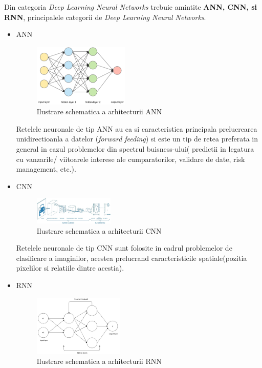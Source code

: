 \documentclass[a4paper]{article}
\begin{document}
Din categoria \textit{Deep Learning Neural
Networks} trebuie amintite \textbf{ANN, CNN, si RNN}, principalele categorii de \textit{Deep Learning Neural Networks}.
\begin{itemize}
	\label{NN}

	\item ANN

\begin{figure}[ht]
	\centering
	\includegraphics[width = 1.8in]{ann.png}
	\caption{Ilustrare schematica a arhitecturii ANN}
\label{ANN}
\end{figure}
Retelele neuronale de tip ANN au ca si caracteristica principala prelucrearea unidirectioanla a datelor (\textit{forward feeding})
si este un tip de retea preferata in general in cazul problemelor din spectrul buisness-ului( predictii in legatura cu vanzarile/
viitoarele interese ale cumparatorilor, validare de date, risk management, etc.).

	\item CNN
\begin{figure}[ht]
	\centering
	\includegraphics[width = 1.5in]{cnn.jpeg}
	\caption{Ilustrare schematica a arhitecturii CNN}
\label{CNN}
\end{figure}


Retelele neuronale de tip CNN sunt folosite in cadrul problemelor de clasificare a imaginilor, acestea prelucrand caracteristicile
spatiale(pozitia pixelilor si relatiile dintre acestia).

	\item RNN
\begin{figure}[ht]
	\centering
	\includegraphics[width = 1.7in]{rnn.jpeg}
	\caption{Ilustrare schematica a arhitecturii RNN}
\label{RNN}


\end{figure}
\end{itemize}
\end{document}
